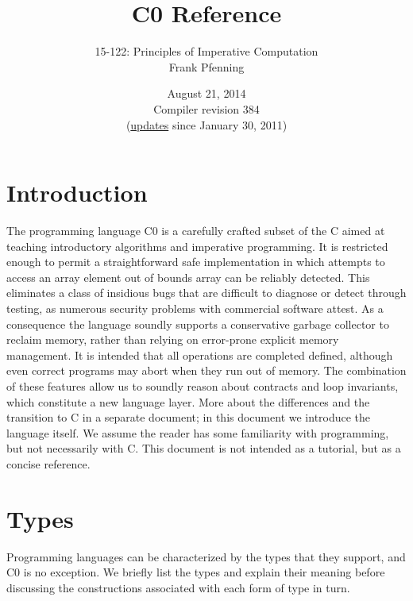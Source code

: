 \documentclass[11pt]{article}
\title{C0 Reference}
\author{15-122: Principles of Imperative Computation \\ Frank Pfenning}
\date{August 21, 2014\\Compiler revision 384\\
  (\hyperlink{sec:updates}{updates} since January 30, 2011)}
\begin{document}
\maketitle

\section{Introduction}

The programming language C0 is a carefully crafted subset of the C
aimed at teaching introductory algorithms and imperative programming.
It is restricted enough to permit a straightforward safe
implementation in which attempts to access an array element out of
bounds array can be reliably detected.  This eliminates a class of
insidious bugs that are difficult to diagnose or detect through
testing, as numerous security problems with commercial software
attest.  As a consequence the language soundly supports a conservative
garbage collector to reclaim memory, rather than relying on
error-prone explicit memory management.  It is intended that all
operations are completed defined, although even correct programs may
abort when they run out of memory.  The combination of these features
allow us to soundly reason about contracts and loop invariants, which
constitute a new language layer.  More about the differences and the
transition to C in a separate document; in this document we introduce
the language itself.  We assume the reader has some familiarity with
programming, but not necessarily with C\@.  This document is not intended
as a tutorial, but as a concise reference.

\section{Types}

Programming languages can be characterized by the types that they support,
and C0 is no exception.  We briefly list the types and explain their
meaning before discussing the constructions associated with each
form of type in turn.
\end{document}
